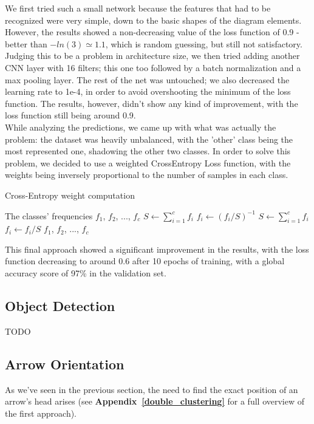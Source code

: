 \documentclass[conference]{IEEEtran}
\begin{document}
We first tried such a small network because the features that had to be recognized were very simple, down to the basic shapes of the diagram elements.
However, the results showed a non-decreasing value of the loss function of 0.9 - better than $-ln(3) \simeq 1.1$, which is random guessing, but still not satisfactory.
\\

Judging this to be a problem in architecture size, we then tried adding another CNN layer with 16 filters; this one too followed by a batch normalization and a max pooling layer.
The rest of the net was untouched; we also decreased the learning rate to 1e-4, in order to avoid overshooting the minimum of the loss function.
The results, however, didn't show any kind of improvement, with the loss function still being around 0.9.
\\

While analyzing the predictions, we came up with what was actually the problem: the dataset was heavily unbalanced, with the 'other' class being the most represented one, shadowing the other two classes.
In order to solve this problem, we decided to use a weighted CrossEntropy Loss function, with the weights being inversely proportional to the number of samples in each class.

\begin{algorithm}
	\caption{Cross-Entropy weight computation}
	\begin{algorithmic}[1]
		\REQUIRE The classes' frequencies $f_1$, $f_2$, ..., $f_c$
		\STATE $S \gets \sum_{i = 1}^c f_i$
		\STATE $f_i \gets (f_i / S)^{-1}$
		\STATE $S \gets \sum_{i = 1}^c f_i$
		\STATE $f_i \gets f_i / S$
		\RETURN $f_1$, $f_2$, ..., $f_c$
	\end{algorithmic}
\end{algorithm}

This final approach showed a significant improvement in the results, with the loss function decreasing to around 0.6 after 10 epochs of training, with a global accuracy score of 97\% in the validation set.

\subsection{Object Detection}
TODO

\subsection{Arrow Orientation}
As we've seen in the previous section, the need to find the exact position of an arrow's head arises (see \textbf{Appendix~\ref{double_clustering}} for a full overview of the first approach).
\end{document}
